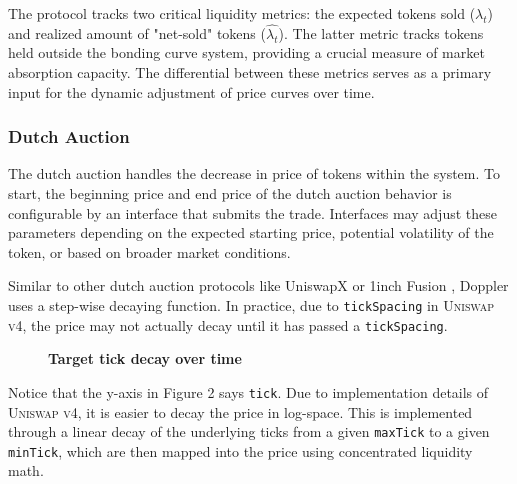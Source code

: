\documentclass[sigconf,nonacm,prologue,table]{acmart}
\numberwithin{equation}{section}
\theoremstyle{definition}
\theoremstyle{remark}
\begin{document}
The protocol tracks two critical liquidity metrics: the expected tokens sold ($\lambda_t$) and realized amount of "net-sold" tokens ($\hat{\lambda_t}$). The latter metric tracks tokens held outside the bonding curve system, providing a crucial measure of market absorption capacity. The differential between these metrics serves as a primary input for the dynamic adjustment of price curves over time.

\subsubsection{Dutch Auction}

The dutch auction handles the decrease in price of tokens within the system. To start, the beginning price and end price of the dutch auction behavior is configurable by an interface that submits the trade. Interfaces may adjust these parameters depending on the expected starting price, potential volatility of the token, or based on broader market conditions. 

Similar to other dutch auction protocols like UniswapX \cite{adamsuniswapx} or 1inch Fusion \cite{1inchfusion}, Doppler uses a step-wise decaying function. In practice, due to \verb|tickSpacing| in \textsc{Uniswap v4}, the price may not actually decay until it has passed a \verb|tickSpacing|. 

\begin{figure}[htb]
    \label{fig:tick_decay}
    \centering
    \caption{\textbf{Target tick decay over time}} 
\end{figure}

Notice that the y-axis in Figure 2 says \verb|tick|. Due to implementation details of \textsc{Uniswap v4}, it is easier to decay the price in log-space. This is implemented through a linear decay of the underlying ticks from a given \verb|maxTick| to a given \verb|minTick|, which are then mapped into the price using concentrated liquidity math. 
\end{document}
